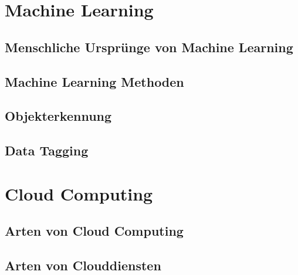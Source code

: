 \section{Machine Learning}
\subsection{Menschliche Ursprünge von Machine Learning}
\subsection{Machine Learning Methoden}
\subsection{Objekterkennung}
\subsection{Data Tagging}

\section{Cloud Computing}
\subsection{Arten von Cloud Computing}
\subsection{Arten von Clouddiensten}

